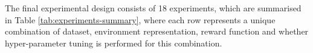 The final experimental design consists of 18 experiments, which are summarised in Table \ref{tab:experiments-summary}, where each row represents a unique combination of dataset, environment representation, reward function and whether hyper-parameter tuning is performed for this combination.


